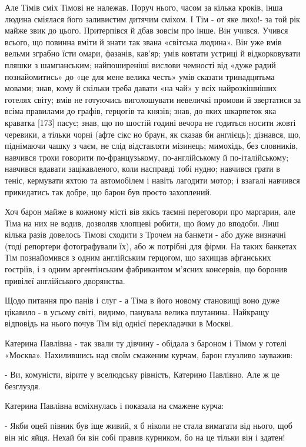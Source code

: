 Але Тімів сміх Тімові не належав. Поруч нього, часом за кілька кроків, інша людина сміялася його заливистим дитячим сміхом. І Тім - от яке лихо!- за той рік майже звик до цього. Притерпівся й дбав зовсім про інше. Він учився. Учився всього, що повинна вміти й знати так звана «світська людина». Він уже вмів вельми зграбно їсти омари, фазанів, кав'яр; умів ковтати устриці й відкорковувати пляшки з шампанським; найпоширеніші вислови чемності від «дуже радий познайомитись» до «це для мене велика честь» умів сказати тринадцятьма мовами; знав, кому й скільки треба давати «на чай» у всіх найрозкішніших готелях світу; вмів не готуючись виголошувати невеличкі промови й звертатися за всіма правилами до графів, герцогів та князів; знав, до яких шкарпеток яка краватка [173] пасує; знав, що по шостій годині вечора не годиться носити жовті черевики, а тільки чорні (афте сікс но браун, як сказав би англієць); дізнався, що, піднімаючи чашку з чаєм, не слід відставляти мізинець; мимохідь, без словників, навчився трохи говорити по-французькому, по-англійському й по-італійському; навчився вдавати зацікавленого, коли насправді тобі нудно; навчився грати в теніс, кермувати яхтою та автомобілем і навіть лагодити мотор; і взагалі навчився прикидатись так добре, що барон був просто захоплений.

Хоч барон майже в кожному місті вів якісь таємні переговори про маргарин, але Тіма на них не водив, дозволяв хлопцеві робити, що йому до вподоби. Лиш кілька разів довелось Тімові сходити з Трочем на банкети - або дуже визначні (тоді репортери фотографували їх), або ж потрібні для фірми. На таких банкетах Тім познайомився з одним англійським герцогом, що захищав афганських гостріїв, і з одним аргентінським фабрикантом м'ясних консервів, що боронив привілеї англійського дворянства.

Щодо питання про панів і слуг - а Тіма в його новому становищі воно дуже цікавило - в усьому світі, видимо, панувала велика плутанина. Найкращу відповідь на нього почув Тім від однієї перекладачки в Москві.

Катерина Павлівна - так звали ту дівчину - обідала з бароном і Тімом у готелі «Москва». Нахилившись над своїм смаженим курчам, барон глузливо зауважив:

- Ви, комуністи, вірите у вселюдську рівність, Катерино Павлівно. Але ж це безглуздя.

Катерина Павлівна всміхнулась і показала на смажене курча:

- Якби оцей півник був іще живий, я б ніколи не стала вимагати від нього, щоб він ніс яйця. Нехай би він собі правив курником, бо на це тільки він і здатен!

